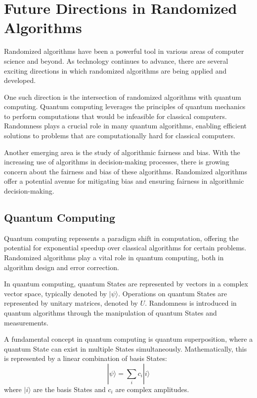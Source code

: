 \documentclass[12pt]{book} %
\begin{document}
\section{Future Directions in Randomized Algorithms}

Randomized algorithms have been a powerful tool in various areas of computer science and beyond. As technology continues to advance, there are several exciting directions in which randomized algorithms are being applied and developed.

One such direction is the intersection of randomized algorithms with quantum computing. Quantum computing leverages the principles of quantum mechanics to perform computations that would be infeasible for classical computers. Randomness plays a crucial role in many quantum algorithms, enabling efficient solutions to problems that are computationally hard for classical computers.

Another emerging area is the study of algorithmic fairness and bias. With the increasing use of algorithms in decision-making processes, there is growing concern about the fairness and bias of these algorithms. Randomized algorithms offer a potential avenue for mitigating bias and ensuring fairness in algorithmic decision-making.

\subsection{Quantum Computing}

Quantum computing represents a paradigm shift in computation, offering the potential for exponential speedup over classical algorithms for certain problems. Randomized algorithms play a vital role in quantum computing, both in algorithm design and error correction.

In quantum computing, quantum States are represented by vectors in a complex vector space, typically denoted by \(|\psi\rangle\). Operations on quantum States are represented by unitary matrices, denoted by \(U\). Randomness is introduced in quantum algorithms through the manipulation of quantum States and measurements.

A fundamental concept in quantum computing is quantum superposition, where a quantum State can exist in multiple States simultaneously. Mathematically, this is represented by a linear combination of basis States:
\[ |\psi\rangle = \sum_{i} c_i |i\rangle \]
where \(|i\rangle\) are the basis States and \(c_i\) are complex amplitudes.
\end{document}
